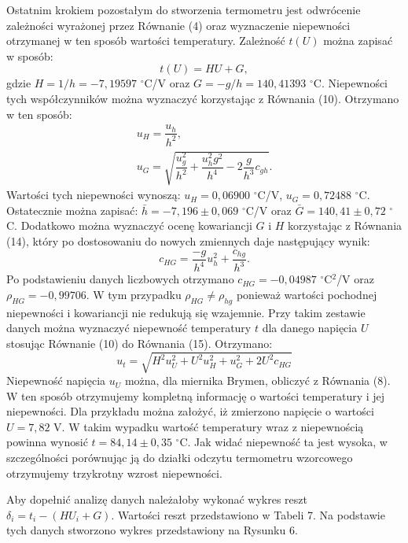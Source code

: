 \documentclass[10pt,a4paper]{article}
\begin{document}
Ostatnim krokiem pozostałym do stworzenia termometru jest odwrócenie zależności wyrażonej przez Równanie (4) oraz wyznaczenie niepewności otrzymanej w ten sposób wartości temperatury. Zależność $t(U)$ można zapisać w sposób:
\begin{equation}
t(U)=HU+G,
\end{equation}
gdzie $H=1/h=-7,19597$ $^{\circ}$C/V  oraz $G=-g/h=140,41393$ $^{\circ}$C. Niepewności tych współczynników można wyznaczyć korzystając z Równania (10).
Otrzymano w ten sposób:
\begin{eqnarray}
u_{H}=\dfrac{u_{h}}{h^2}, \\
u_{G}=\sqrt{\dfrac{u_{g}^2}{h^2}+\dfrac{u_{h}^2 g^2}{h^4}-2\dfrac{g}{h^3}c_{gh}}.
\end{eqnarray}
Wartości tych niepewności wynoszą: $u_{H}=0,06900$ $^{\circ}$C/V, $u_{G}=0,72488$ $^{\circ}$C. 
Ostatecznie można zapisać: $\bar{h}=-7,196\pm0,069$ $^{\circ}$C/V oraz $\bar{G}=140,41\pm0,72$ $^{\circ}$C.
Dodatkowo można wyznaczyć ocenę kowariancji $G$ i $H$ korzystając z Równania (14), który po dostosowaniu do nowych zmiennych daje następujący wynik:
\begin{equation}
c_{HG}=\dfrac{-g}{h^4}u_{h}^2+\dfrac{c_{hg}}{h^3}.
\end{equation}
Po podstawieniu danych liczbowych otrzymano $c_{HG}=-0,04987$ $^{\circ}$C$^2$/V oraz $\rho_{HG}=-0,99706$. W tym przypadku $\rho_{HG}\neq\rho_{hg}$ ponieważ wartości pochodnej niepewności i kowariancji nie redukują się wzajemnie. Przy takim zestawie danych można wyznaczyć niepewność temperatury $t$ dla danego napięcia $U$ stosując Równanie (10) do Równania (15). Otrzymano:
\begin{equation}
u_{t}=\sqrt{H^2u_{U}^2+U^2u_{H}^2+u_{G}^2+2U^2c_{HG}}
\end{equation}
Niepewność napięcia $u_{U}$ można, dla miernika Brymen, obliczyć z Równania (8). W ten sposób otrzymujemy kompletną informację o wartości temperatury i jej niepewności. Dla przykładu można założyć, iż zmierzono napięcie o wartości $U=7,82$ V. W takim wypadku wartość temperatury wraz z niepewnością powinna wynosić $t=84,14\pm0,35$ $^{\circ}$C. Jak widać niepewność ta jest wysoka, w szczególności porównując ją do działki odczytu termometru wzorcowego otrzymujemy trzykrotny wzrost niepewności. 

Aby dopełnić analizę danych należałoby wykonać wykres reszt $\delta_{i}=t_{i}-(HU_{i}+G)$. Wartości reszt przedstawiono w Tabeli 7. Na podstawie tych danych stworzono wykres przedstawiony na Rysunku 6.
\end{document}
